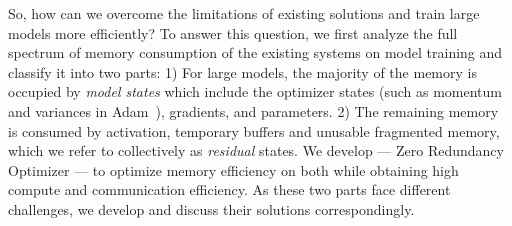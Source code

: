 So, how can we overcome the limitations of existing solutions and train large models more efficiently? To answer this question, we first analyze the full spectrum of memory consumption of the existing systems on model training and classify it into two parts:  1) For large models, the majority of the memory is occupied by \emph{model states} which include the optimizer states (such as momentum and variances in Adam~\cite{DBLP:journals/corr/Adam}), gradients, and  parameters. %
2) The remaining memory is consumed by activation, temporary buffers and unusable fragmented memory, which we refer to collectively as \emph{residual} states.
We develop \name --- Zero Redundancy Optimizer  --- to optimize memory efficiency on both while obtaining high compute and communication efficiency.
As these two parts face different challenges, we develop and discuss their solutions correspondingly.

